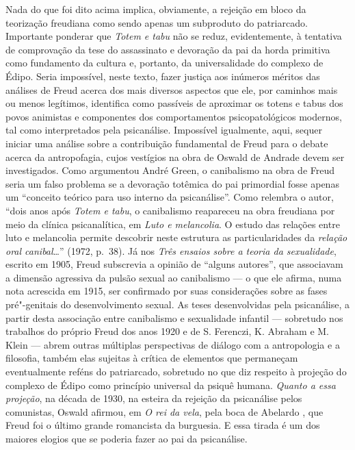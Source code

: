 Nada do que foi dito acima implica, obviamente, a rejeição em bloco da
teorização freudiana como sendo apenas um subproduto do patriarcado.
Importante ponderar que \emph{Totem e tabu} não se reduz, evidentemente,
à tentativa de comprovação da tese do assassinato e devoração da pai da
horda primitiva como fundamento da cultura e, portanto, da
universalidade do complexo de Édipo. Seria impossível, neste texto,
fazer justiça aos inúmeros méritos das análises de Freud acerca dos mais
diversos aspectos que ele, por caminhos mais ou menos legítimos,
identifica como passíveis de aproximar os totens e tabus dos povos
animistas e componentes dos comportamentos psicopatológicos modernos,
tal como interpretados pela psicanálise. Impossível igualmente, aqui,
sequer iniciar uma análise sobre a contribuição fundamental de Freud
para o debate acerca da antropofagia, cujos vestígios na obra de Oswald
de Andrade devem ser investigados. Como argumentou André Green, o
canibalismo na obra de Freud seria um falso problema se a devoração
totêmica do pai primordial fosse apenas um ``conceito teórico para uso
interno da psicanálise''. Como relembra o autor, ``dois anos após
\emph{Totem e tabu}, o canibalismo reapareceu na obra freudiana por meio
da clínica psicanalítica, em \emph{Luto e melancolia}. O estudo das
relações entre luto e melancolia permite descobrir neste estrutura as
particularidades da \emph{relação oral canibal}\ldots{}'' (1972, p.~38).
Já nos \emph{Três ensaios sobre a teoria da sexualidade}, escrito
em 1905, Freud subscrevia a opinião de ``alguns autores'', que
associavam a dimensão agressiva da pulsão sexual ao canibalismo --- o
que ele afirma, numa nota acrescida em 1915, ser confirmado por suas
considerações sobre as fases pré"-genitais do desenvolvimento sexual. As
teses desenvolvidas pela psicanálise, a partir desta associação entre
canibalismo e sexualidade infantil --- sobretudo nos trabalhos do próprio
Freud dos anos 1920 e de S. Ferenczi, K. Abraham e M. Klein --- abrem
outras múltiplas perspectivas de diálogo com a antropologia e a
filosofia, também elas sujeitas à crítica de elementos que permaneçam
eventualmente reféns do patriarcado, sobretudo no que diz respeito à
projeção do complexo de Édipo como princípio universal da psiquê humana.
\emph{Quanto a essa projeção}, na década de 1930, na esteira da rejeição
da psicanálise pelos comunistas, Oswald afirmou, em \emph{O rei da
vela}, pela boca de Abelardo , que Freud foi o último grande romancista
da burguesia. E essa tirada é um dos maiores elogios que se poderia
fazer ao pai da psicanálise.

